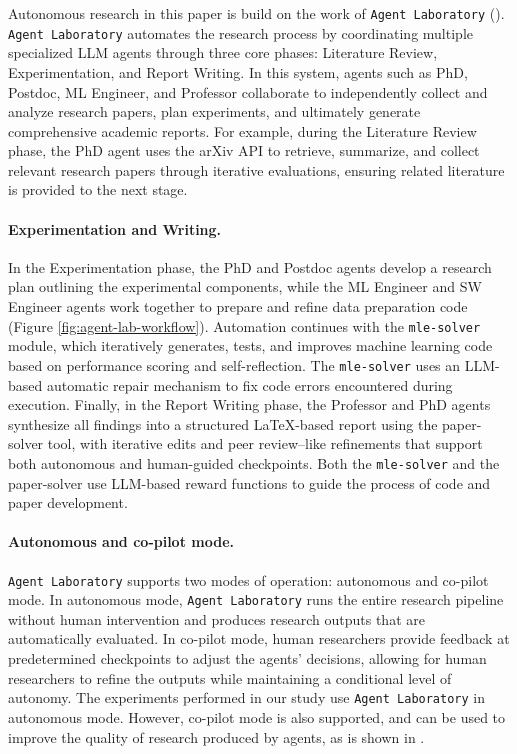 \documentclass[11pt, a4paper]{include/gdm_format}
\begin{document}
Autonomous research in this paper is build on the work of \texttt{Agent Laboratory} (\cite{schmidgall2025agent}). \texttt{Agent Laboratory} automates the research process by coordinating multiple specialized LLM agents through three core phases: Literature Review, Experimentation, and Report Writing. In this system, agents such as PhD, Postdoc, ML Engineer, and Professor collaborate to independently collect and analyze research papers, plan experiments, and ultimately generate comprehensive academic reports. For example, during the Literature Review phase, the PhD agent uses the arXiv API to retrieve, summarize, and collect relevant research papers through iterative evaluations, ensuring related literature is provided to the next stage.

\paragraph{Experimentation and Writing.} In the Experimentation phase, the PhD and Postdoc agents develop a research plan outlining the experimental components, while the ML Engineer and SW Engineer agents work together to prepare and refine data preparation code (Figure \ref{fig:agent-lab-workflow}). Automation continues with the \texttt{mle-solver} module, which iteratively generates, tests, and improves machine learning code based on performance scoring and self-reflection. The \texttt{mle-solver} uses an LLM-based automatic repair mechanism to fix code errors encountered during execution.  Finally, in the Report Writing phase, the Professor and PhD agents synthesize all findings into a structured LaTeX-based report using the paper-solver tool, with iterative edits and peer review–like refinements that support both autonomous and human-guided checkpoints. Both the \texttt{mle-solver} and the paper-solver use LLM-based reward functions to guide the process of code and paper development.

\paragraph{Autonomous and co-pilot mode.}
\texttt{Agent Laboratory} supports two modes of operation: autonomous and co-pilot mode. In autonomous mode, \texttt{Agent Laboratory} runs the entire research pipeline without human intervention and produces research outputs that are automatically evaluated. In co-pilot mode, human researchers provide feedback at predetermined checkpoints to adjust the agents’ decisions, allowing for human researchers to refine the outputs while maintaining a conditional level of autonomy. The experiments performed in our study use \texttt{Agent Laboratory} in autonomous mode. However, co-pilot mode is also supported, and can be used to improve the quality of research produced by agents, as is shown in \cite{schmidgall2025agent}.
\end{document}
